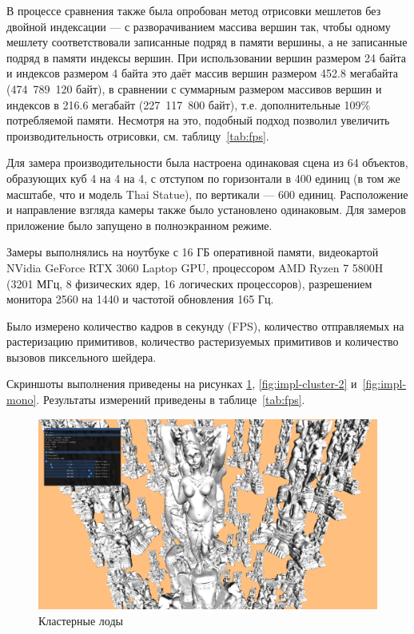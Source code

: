 В процессе сравнения также была опробован метод отрисовки мешлетов без двойной индексации --- с разворачиванием массива вершин так, чтобы одному мешлету соответствовали записанные подряд в памяти вершины, а не записанные подряд в памяти индексы вершин.
При использовании вершин размером 24 байта и индексов размером 4 байта это даёт массив вершин размером 452.8 мегабайта (474~789~120 байт), в сравнении с суммарным размером массивов вершин и индексов в 216.6 мегабайт (227~117~800 байт), т.е. дополнительные 109\% потребляемой памяти.
Несмотря на это, подобный подход позволил увеличить производительность отрисовки, см. таблицу~\ref{tab:fps}.

Для замера производительности была настроена одинаковая сцена из 64 объектов, образующих куб 4 на 4 на 4, с отступом по горизонтали в 400 единиц (в том же масштабе, что и модель Thai Statue), по вертикали --- 600 единиц.
Расположение и направление взгляда камеры также было установлено одинаковым.
Для замеров приложение было запущено в полноэкранном режиме.

Замеры выполнялись на ноутбуке с 16 ГБ оперативной памяти, видеокартой NVidia GeForce RTX 3060 Laptop GPU, процессором AMD Ryzen 7 5800H (3201 МГц, 8 физических ядер, 16 логических процессоров), разрешением монитора 2560 на 1440 и частотой обновления 165 Гц.

Было измерено количество кадров в секунду (FPS), количество отправляемых на растеризацию примитивов, количество растеризуемых примитивов и количество вызовов пиксельного шейдера.

Скриншоты выполнения приведены на рисунках \ref{fig:impl-cluster-1}, \ref{fig:impl-cluster-2} и~\ref{fig:impl-mono}.
Результаты измерений приведены в таблице~\ref{tab:fps}.

\begin{figure}[ht]
    \centering
    \includegraphics[width=\textwidth]{pics/impl1.png}
    \caption{Кластерные лоды}
    \label{fig:impl-cluster-1}
\end{figure}

